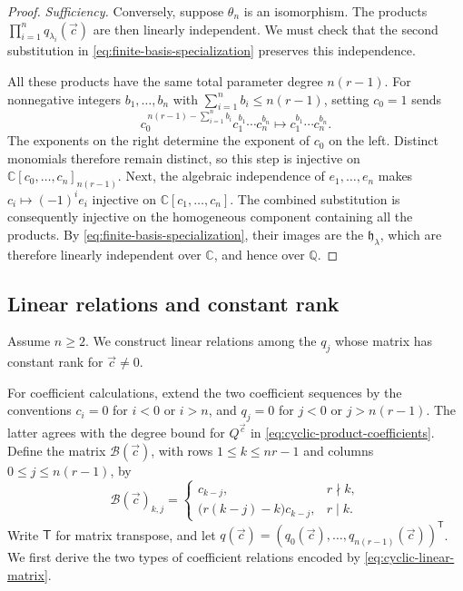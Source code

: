 \documentclass[12pt,reqno,a4paper]{amsart}
\numberwithin{equation}{section}
\numberwithin{figure}{section}
\theoremstyle{plain}
\theoremstyle{definition}
\begin{document}
\begin{proof}
\emph{Sufficiency.}  Conversely, suppose $\theta_n$ is an
isomorphism.  The products $\prod_{i=1}^n q_{\lambda_i}(\vec c)$ are
then linearly independent.  We must check that the second
substitution in \eqref{eq:finite-basis-specialization} preserves
this independence.

All these products have the same total parameter degree $n(r-1)$.
For nonnegative integers $b_1,\ldots,b_n$ with
$\sum_{i=1}^n b_i\leq n(r-1)$, setting $c_0=1$ sends
\[
 c_0^{\,n(r-1)-\sum_{i=1}^n b_i}
       c_1^{b_1}\cdots c_n^{b_n}
 \longmapsto c_1^{b_1}\cdots c_n^{b_n}.
\]
The exponents on the right determine the exponent of $c_0$ on the
left.  Distinct monomials therefore remain distinct, so this step
is injective on $\mathbb C[c_0,\ldots,c_n]_{n(r-1)}$.
Next, the algebraic independence of $e_1,\ldots,e_n$ makes
$c_i\mapsto(-1)^ie_i$ injective on $\mathbb C[c_1,\ldots,c_n]$.
The combined substitution is consequently injective on the
homogeneous component containing all the products.
By \eqref{eq:finite-basis-specialization}, their images are the
$\mathfrak h_\lambda$, which are therefore linearly independent
over $\mathbb C$, and hence over $\mathbb Q$.
\end{proof}

\subsection{Linear relations and constant rank}
\label{subsec:cyclic-constant-rank}

Assume $n\geq2$.  We construct linear relations among the $q_j$
whose matrix has constant rank for $\vec c\ne0$.

For coefficient calculations, extend the two coefficient sequences
by the conventions $c_i=0$ for $i<0$ or $i>n$, and $q_j=0$ for
$j<0$ or $j>n(r-1)$.  The latter agrees with the degree bound for
$Q^{\vec c}$ in \eqref{eq:cyclic-product-coefficients}.
Define the matrix $\mathcal B(\vec c)$, with rows
$1\leq k\leq nr-1$ and columns $0\leq j\leq n(r-1)$, by
\begin{equation}\label{eq:cyclic-linear-matrix}
 \mathcal B(\vec c)_{k,j}=
 \begin{cases}
 c_{k-j},&r\nmid k,\\
 \bigl(r(k-j)-k\bigr)c_{k-j},&r\mid k.
 \end{cases}
\end{equation}
Write $\mathsf T$ for matrix transpose, and let
$q(\vec c)=(q_0(\vec c),\ldots,q_{n(r-1)}(\vec c))^{\mathsf T}$.
We first derive the two types of coefficient relations encoded
by \eqref{eq:cyclic-linear-matrix}.
\end{document}
